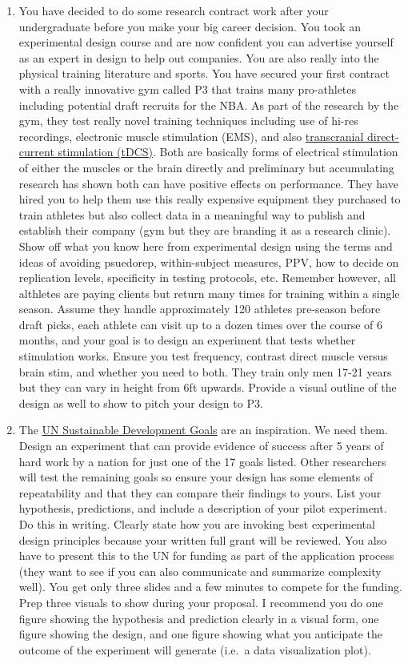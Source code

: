 \documentclass[
]{book}
\begin{document}
\begin{enumerate}
\item
  You have decided to do some research contract work after your undergraduate before you make your big career decision. You took an experimental design course and are now confident you can advertise yourself as an expert in design to help out companies. You are also really into the physical training literature and sports. You have secured your first contract with a really innovative gym called P3 that trains many pro-athletes including potential draft recruits for the NBA. As part of the research by the gym, they test really novel training techniques including use of hi-res recordings, electronic muscle stimulation (EMS), and also \href{https://en.wikipedia.org/wiki/Transcranial_direct-current_stimulation}{transcranial direct-current stimulation (tDCS)}. Both are basically forms of electrical stimulation of either the muscles or the brain directly and preliminary but accumulating research has shown both can have positive effects on performance. They have hired you to help them use this really expensive equipment they purchased to train athletes but also collect data in a meaningful way to publish and establish their company (gym but they are branding it as a research clinic). Show off what you know here from experimental design using the terms and ideas of avoiding psuedorep, within-subject measures, PPV, how to decide on replication levels, specificity in testing protocols, etc. Remember however, all althletes are paying clients but return many times for training within a single season. Assume they handle approximately 120 athletes pre-season before draft picks, each athlete can visit up to a dozen times over the course of 6 months, and your goal is to design an experiment that tests whether stimulation works. Ensure you test frequency, contrast direct muscle versus brain stim, and whether you need to both. They train only men 17-21 years but they can vary in height from 6ft upwards. Provide a visual outline of the design as well to show to pitch your design to P3.
\item
  The \href{https://sustainabledevelopment.un.org/sdgs}{UN Sustainable Development Goals} are an inspiration. We need them. Design an experiment that can provide evidence of success after 5 years of hard work by a nation for just one of the 17 goals listed. Other researchers will test the remaining goals so ensure your design has some elements of repeatability and that they can compare their findings to yours.
  List your hypothesis, predictions, and include a description of your pilot experiment. Do this in writing. Clearly state how you are invoking best experimental design principles because your written full grant will be reviewed. You also have to present this to the UN for funding as part of the application process (they want to see if you can also communicate and summarize complexity well). You get only three slides and a few minutes to compete for the funding. Prep three visuals to show during your proposal. I recommend you do one figure showing the hypothesis and prediction clearly in a visual form, one figure showing the design, and one figure showing what you anticipate the outcome of the experiment will generate (i.e.~a data visualization plot).

\end{enumerate}
\end{document}
